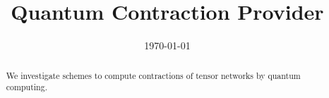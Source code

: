 \documentclass[aps,onecolumn,nofootinbib,pra]{article}
\begin{document}
    \title{Quantum Contraction Provider}

    \maketitle
    \date{\today}
    \begin{abstract}
        We investigate schemes to compute contractions of tensor networks by quantum computing.
    \end{abstract}

    \tableofcontents

    
    
    
    

    

    
    
\end{document}
